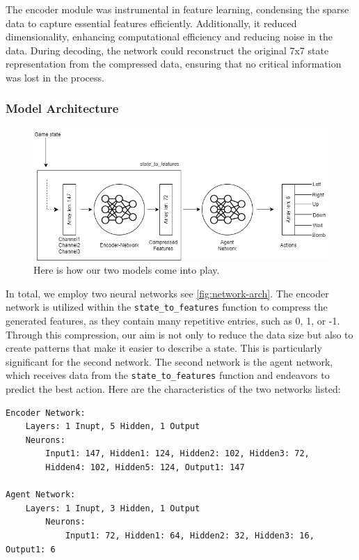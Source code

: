 The encoder module was instrumental in feature learning, condensing the sparse data to capture essential features efficiently. 
Additionally, it reduced dimensionality, enhancing computational efficiency and reducing noise in the data. During decoding, the network could 
reconstruct the original 7x7 state representation from the compressed data, ensuring that no critical information was lost in the process.

\subsubsection*{Model Architecture}

\begin{figure}[H]
    \centering
    
    \includegraphics[width=\oneImgWidth]{images/network-arch}%
    
    \captionadjust%
    \caption{\label{fig:network-arch} Here is how our two models come into play.
    }%
\end{figure}

In total, we employ two neural networks see \autoref{fig:network-arch}. The encoder network is utilized within the \verb|state_to_features| function to compress the 
generated features, as they contain many repetitive entries, such as 0, 1, or -1. Through this compression, our aim is not only to reduce 
the data size but also to create patterns that make it easier to describe a state. This is particularly significant for the second network. 
The second network is the agent network, which receives data from the \verb|state_to_features| function and endeavors to predict the best action.
Here are the characteristics of the two networks listed:

\begin{verbatim}
Encoder Network:
    Layers: 1 Inupt, 5 Hidden, 1 Output
    Neurons: 
        Input1: 147, Hidden1: 124, Hidden2: 102, Hidden3: 72,
        Hidden4: 102, Hidden5: 124, Output1: 147

Agent Network:
    Layers: 1 Inupt, 3 Hidden, 1 Output
        Neurons: 
            Input1: 72, Hidden1: 64, Hidden2: 32, Hidden3: 16, Output1: 6
\end{verbatim}

